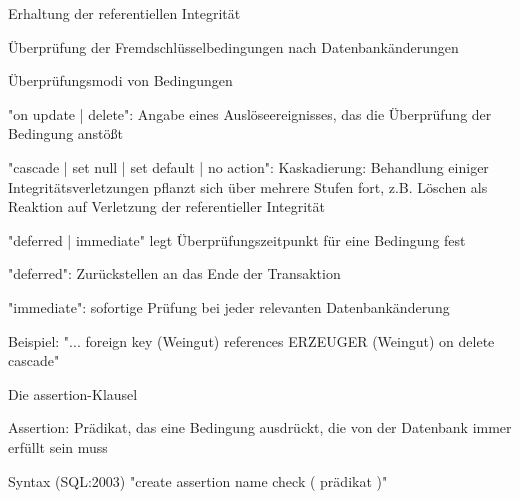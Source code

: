 \documentclass[a4paper]{article}
\begin{document}
\begin{multicols}{3}
\begin{itemize*}
        Erhaltung der referentiellen Integrität
        \begin{itemize*}
            \item Überprüfung der Fremdschlüsselbedingungen nach Datenbankänderungen
            \item Überprüfungsmodi von Bedingungen
            \begin{itemize*}
                \item "on update | delete": Angabe eines Auslöseereignisses, das die Überprüfung der Bedingung anstößt
                \item "cascade | set null | set default | no action": Kaskadierung: Behandlung einiger Integritätsverletzungen pflanzt sich über mehrere Stufen fort, z.B. Löschen als Reaktion auf Verletzung der referentieller Integrität
                \item "deferred | immediate" legt Überprüfungszeitpunkt für eine Bedingung fest
                \item "deferred": Zurückstellen an das Ende der Transaktion
                \item "immediate": sofortige Prüfung bei jeder relevanten Datenbankänderung
                \item Beispiel: "... foreign key (Weingut) references ERZEUGER (Weingut) on delete cascade"
            \end{itemize*}
        \end{itemize*}

        Die assertion-Klausel
        \begin{itemize*}
            \item Assertion: Prädikat, das eine Bedingung ausdrückt, die von der Datenbank immer erfüllt sein muss
            \item Syntax (SQL:2003) "create assertion name check ( prädikat )"
        \end{itemize*}


\end{itemize*}
\end{multicols}
\end{document}
